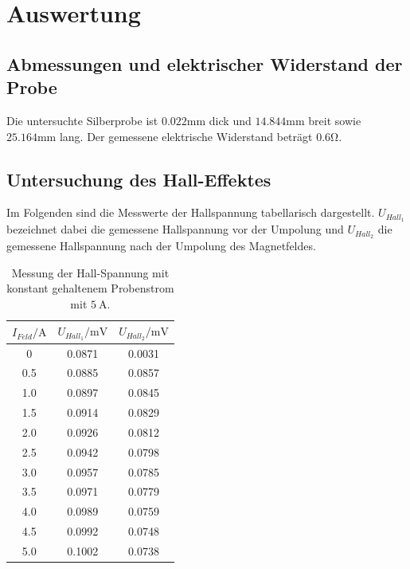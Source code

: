 \section{Auswertung}
  \subsection{Abmessungen und elektrischer Widerstand der Probe}
    Die untersuchte Silberprobe ist $0.022 \si{\milli\meter}$ dick und $14.844 \si{\milli\meter}$ breit sowie
    $25.164\si{\milli\meter}$ lang. Der gemessene elektrische Widerstand beträgt $0.6 \si{\ohm}$.
  \subsection{Untersuchung des Hall-Effektes}
  Im Folgenden sind die Messwerte der Hallspannung tabellarisch dargestellt. $U_{Hall_1}$ bezeichnet dabei die
  gemessene Hallspannung vor der Umpolung und $U_{Hall_2}$ die gemessene Hallspannung nach der Umpolung des
  Magnetfeldes.
    \begin{table}[H]
      \centering
        \caption{Messung der Hall-Spannung mit konstant gehaltenem Probenstrom mit $\SI{5}{\ampere}$.}
        \label{tab:hallspannung1}
        \begin{tabular}{S S S }
          \toprule
          {$I_{Feld} /\si{\ampere}$} & {$U_{Hall_1} /\si{\milli\volt}$} & {$U_{Hall_2} / \si{\milli\volt}$}\\%
             & 0.0871 & 0.0031 \\
          0.5 & 0.0885 & 0.0857 \\
          1.0 & 0.0897 & 0.0845 \\
          1.5 & 0.0914 & 0.0829 \\
          2.0 & 0.0926 & 0.0812 \\
          2.5 & 0.0942 & 0.0798 \\
          3.0 & 0.0957 & 0.0785 \\
          3.5 & 0.0971 & 0.0779 \\
          4.0 & 0.0989 & 0.0759 \\
          4.5 & 0.0992 & 0.0748 \\
          5.0 & 0.1002 & 0.0738 \\
          \bottomrule
        \end{tabular}
      \end{table}
